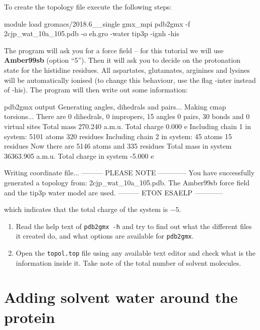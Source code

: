 \documentclass[10pt]{article}
\begin{document}
To create the topology file execute the following steps:

\begin{cmdline}
module load gromacs/2018.6__single
gmx_mpi pdb2gmx -f 2cjp_wat_10a_105.pdb -o eh.gro -water tip3p -ignh -his 
\end{cmdline}

The program will ask you for a force field -- for this tutorial we will use \textbf{Amber99sb} (option ``5''). Then it will ask you to decide on the protonation state for the histidine residues. All aspartates, glutamates, arginines and lysines will be automatically ionised (to change this behaviour, use the flag -inter instead of -his). The program will then write out some information:

\begin{script}{pdb2gmx output}
Generating angles, dihedrals and pairs...
Making cmap torsions...
There are    0 dihedrals,    0 impropers,   15 angles
             0 pairs,       30 bonds and     0 virtual sites
Total mass 270.240 a.m.u.
Total charge 0.000 e
Including chain 1 in system: 5101 atoms 320 residues
Including chain 2 in system: 45 atoms 15 residues
Now there are 5146 atoms and 335 residues
Total mass in system 36363.905 a.m.u.
Total charge in system -5.000 e

Writing coordinate file...
		--------- PLEASE NOTE ------------
You have successfully generated a topology from: 2cjp_wat_10a_105.pdb.
The Amber99sb force field and the tip3p water model are used.
		--------- ETON ESAELP ------------
\end{script}

which indicates that the total charge of the system is \(-5\).

\begin{summary} 
    \begin{enumerate}[leftmargin=0.6cm]
        \renewcommand{\labelenumi}{Q\arabic{enumi}.}
        \setcounter{enumi}{4}
        \item Read the help text of \texttt{pdb2gmx -h} and try to find out what the different files it created do, and what options are available for \texttt{pdb2gmx}. 
        \item Open the \texttt{topol.top} file using any available text editor and check what is the information inside it. Take note of the total number of solvent molecules. 
    \end{enumerate}
\end{summary}


\section{Adding solvent water around the protein}
\end{document}
